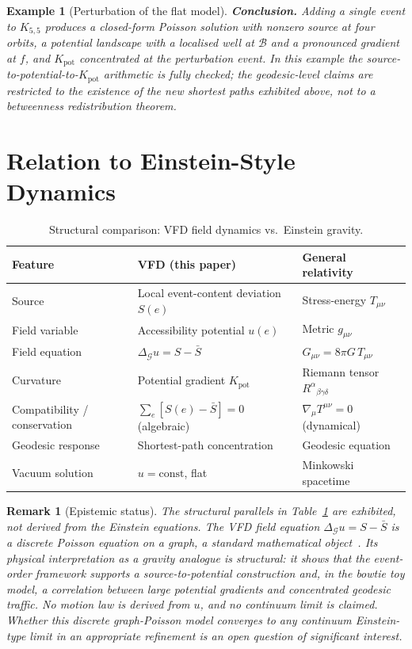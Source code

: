 \documentclass[12pt]{article}
\newtheorem{remark}[theorem]{Remark}
\newtheorem{example}[theorem]{Example}
\newcommand{\Gcal}{\mathcal{G}}
\begin{document}
\begin{example}[Perturbation of the flat model]
\textbf{Conclusion.} Adding a single event to $K_{5,5}$ produces a closed-form Poisson solution with nonzero source at four orbits, a potential landscape with a localised well at $\mathcal{B}$ and a pronounced gradient at $f$, and $K_{\mathrm{pot}}$ concentrated at the perturbation event. In this example the source-to-potential-to-$K_{\mathrm{pot}}$ arithmetic is fully checked; the geodesic-level claims are restricted to the existence of the new shortest paths exhibited above, not to a betweenness redistribution theorem.
\end{example}

\section{Relation to Einstein-Style Dynamics}\label{sec:einstein}

\begin{table}[ht]
\centering
\caption{Structural comparison: VFD field dynamics vs.\ Einstein gravity.}
\label{tab:einstein}
\begin{tabular}{@{}lll@{}}
\toprule
Feature & VFD (this paper) & General relativity \\
\midrule
Source & Local event-content deviation $S(e)$ & Stress-energy $T_{\mu\nu}$ \\
Field variable & Accessibility potential $u(e)$ & Metric $g_{\mu\nu}$ \\
Field equation & $\Delta_\Gcal u = S - \bar{S}$ & $G_{\mu\nu} = 8\pi G\, T_{\mu\nu}$ \\
Curvature & Potential gradient $K_{\mathrm{pot}}$ & Riemann tensor $R^\alpha{}_{\beta\gamma\delta}$ \\
Compatibility / conservation & $\sum_e [S(e) - \bar{S}] = 0$ (algebraic) & $\nabla_\mu T^{\mu\nu} = 0$ (dynamical) \\
Geodesic response & Shortest-path concentration & Geodesic equation \\
Vacuum solution & $u = \mathrm{const}$, flat & Minkowski spacetime \\
\bottomrule
\end{tabular}
\end{table}

\begin{remark}[Epistemic status]
The structural parallels in Table~\ref{tab:einstein} are exhibited, not derived from the Einstein equations. The VFD field equation $\Delta_\Gcal u = S - \bar{S}$ is a discrete Poisson equation on a graph, a standard mathematical object~\citep{Chung1997}. Its physical interpretation as a gravity analogue is structural: it shows that the event-order framework supports a source-to-potential construction and, in the bowtie toy model, a correlation between large potential gradients and concentrated geodesic traffic. No motion law is derived from $u$, and no continuum limit is claimed. Whether this discrete graph-Poisson model converges to any continuum Einstein-type limit in an appropriate refinement is an open question of significant interest.
\end{remark}
\end{document}
